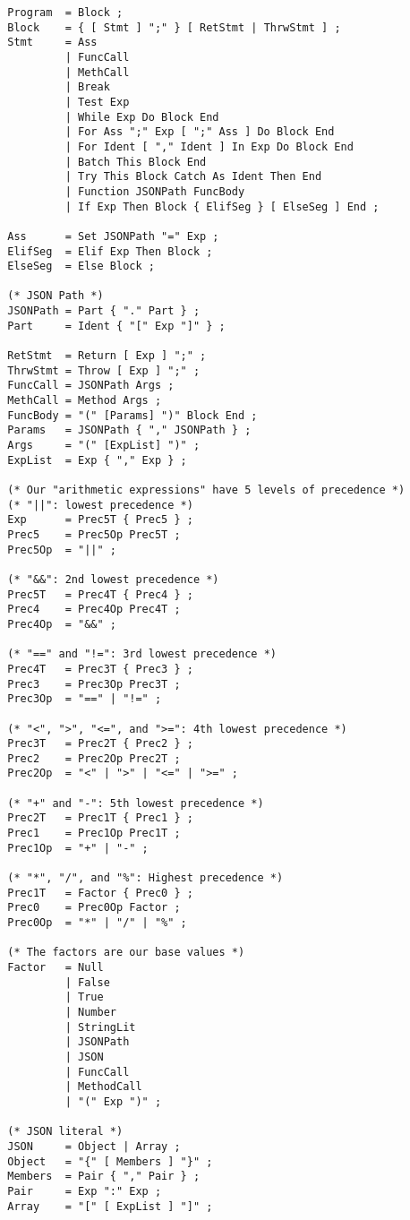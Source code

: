 \documentclass[12pt, letterpaper]{article}
\begin{document}
\begin{center}
    \begin{verbatim}
        Program  = Block ;
        Block    = { [ Stmt ] ";" } [ RetStmt | ThrwStmt ] ;
        Stmt     = Ass
                 | FuncCall
                 | MethCall
                 | Break
                 | Test Exp
                 | While Exp Do Block End
                 | For Ass ";" Exp [ ";" Ass ] Do Block End
                 | For Ident [ "," Ident ] In Exp Do Block End
                 | Batch This Block End
                 | Try This Block Catch As Ident Then End
                 | Function JSONPath FuncBody
                 | If Exp Then Block { ElifSeg } [ ElseSeg ] End ;

        Ass      = Set JSONPath "=" Exp ;
        ElifSeg  = Elif Exp Then Block ;
        ElseSeg  = Else Block ;

        (* JSON Path *)
        JSONPath = Part { "." Part } ;
        Part     = Ident { "[" Exp "]" } ;

        RetStmt  = Return [ Exp ] ";" ;
        ThrwStmt = Throw [ Exp ] ";" ;
        FuncCall = JSONPath Args ;
        MethCall = Method Args ;
        FuncBody = "(" [Params] ")" Block End ;
        Params   = JSONPath { "," JSONPath } ;
        Args     = "(" [ExpList] ")" ;
        ExpList  = Exp { "," Exp } ;

        (* Our "arithmetic expressions" have 5 levels of precedence *)
        (* "||": lowest precedence *)
        Exp      = Prec5T { Prec5 } ;
        Prec5    = Prec5Op Prec5T ;
        Prec5Op  = "||" ;

        (* "&&": 2nd lowest precedence *)
        Prec5T   = Prec4T { Prec4 } ;
        Prec4    = Prec4Op Prec4T ;
        Prec4Op  = "&&" ;

        (* "==" and "!=": 3rd lowest precedence *)
        Prec4T   = Prec3T { Prec3 } ;
        Prec3    = Prec3Op Prec3T ;
        Prec3Op  = "==" | "!=" ;

        (* "<", ">", "<=", and ">=": 4th lowest precedence *)
        Prec3T   = Prec2T { Prec2 } ;
        Prec2    = Prec2Op Prec2T ;
        Prec2Op  = "<" | ">" | "<=" | ">=" ;

        (* "+" and "-": 5th lowest precedence *)
        Prec2T   = Prec1T { Prec1 } ;
        Prec1    = Prec1Op Prec1T ;
        Prec1Op  = "+" | "-" ;

        (* "*", "/", and "%": Highest precedence *)
        Prec1T   = Factor { Prec0 } ;
        Prec0    = Prec0Op Factor ;
        Prec0Op  = "*" | "/" | "%" ;

        (* The factors are our base values *)
        Factor   = Null
                 | False
                 | True
                 | Number
                 | StringLit
                 | JSONPath
                 | JSON
                 | FuncCall
                 | MethodCall
                 | "(" Exp ")" ;

        (* JSON literal *)
        JSON     = Object | Array ;
        Object   = "{" [ Members ] "}" ;
        Members  = Pair { "," Pair } ;
        Pair     = Exp ":" Exp ;
        Array    = "[" [ ExpList ] "]" ;
    \end{verbatim}
\end{center}
\end{document}
